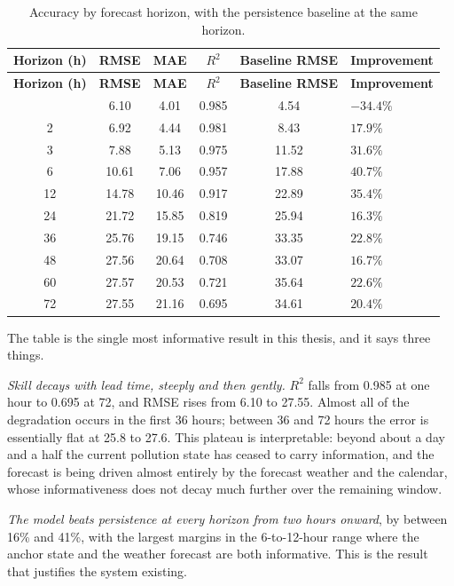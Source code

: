 \begin{xltabular}{\textwidth}{C C C C C Y}
\caption{Accuracy by forecast horizon, with the persistence baseline at the same
horizon.}\label{tab:horizon}\\
\toprule
\bfseries Horizon (h) & \bfseries RMSE & \bfseries MAE & \bfseries $R^2$ &
\bfseries Baseline RMSE & \bfseries Improvement \\
\midrule
\endfirsthead
\toprule
\bfseries Horizon (h) & \bfseries RMSE & \bfseries MAE & \bfseries $R^2$ &
\bfseries Baseline RMSE & \bfseries Improvement \\
\midrule
\endhead
\bottomrule
{} & 6.10 & 4.01 & 0.985 & 4.54 & $-34.4\%$ \\
2 & 6.92 & 4.44 & 0.981 & 8.43 & $17.9\%$ \\
3 & 7.88 & 5.13 & 0.975 & 11.52 & $31.6\%$ \\
6 & 10.61 & 7.06 & 0.957 & 17.88 & $40.7\%$ \\
12 & 14.78 & 10.46 & 0.917 & 22.89 & $35.4\%$ \\
24 & 21.72 & 15.85 & 0.819 & 25.94 & $16.3\%$ \\
36 & 25.76 & 19.15 & 0.746 & 33.35 & $22.8\%$ \\
48 & 27.56 & 20.64 & 0.708 & 33.07 & $16.7\%$ \\
60 & 27.57 & 20.53 & 0.721 & 35.64 & $22.6\%$ \\
72 & 27.55 & 21.16 & 0.695 & 34.61 & $20.4\%$ \\
\end{xltabular}


The table is the single most informative result in this thesis, and it says three
things.

\emph{Skill decays with lead time, steeply and then gently.} $R^2$ falls from
0.985 at one hour to 0.695 at 72, and RMSE rises from 6.10 to 27.55. Almost all of
the degradation occurs in the first 36 hours; between 36 and 72 hours the error is
essentially flat at 25.8 to 27.6. This plateau is interpretable: beyond about a
day and a half the current pollution state has ceased to carry information, and
the forecast is being driven almost entirely by the forecast weather and the
calendar, whose informativeness does not decay much further over the remaining
window.

\emph{The model beats persistence at every horizon from two hours onward}, by
between 16\% and 41\%, with the largest margins in the 6-to-12-hour range where
the anchor state and the weather forecast are both informative. This is the
result that justifies the system existing.

